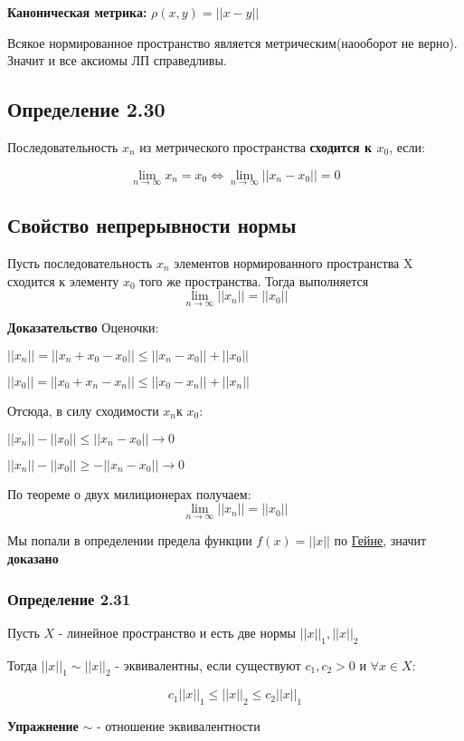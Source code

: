 \documentclass[12pt, english]{article}
\begin{document}
		\textbf{Каноническая метрика:} $\rho(x,y) = ||x-y||$
		
		Всякое нормированное пространство является метрическим(наооборот не верно). Значит и все аксиомы ЛП справедливы.
		
\subsection*{Определение 2.30}
	
	Последовательность ${x_n}$ из метрического пространства \textbf{сходится к $x_0$}, если:
	
	$$\lim_{n \to \infty} x_n = x_0 \Leftrightarrow \lim_{n \to \infty} ||x_n - x_0|| = 0$$
	
\subsection*{Свойство непрерывности нормы}\label{eq100}
	Пусть последовательность ${x_n}$ элементов нормированного пространства X сходится к элементу $x_0$ того же пространства. Тогда выполняется	
	$$\lim_{n \to \infty} ||x_n|| = ||x_0||$$
		
\textbf{Доказательство}		
	Оценочки:
	
	$||x_n|| = ||x_n + x_0 - x_0|| \leq ||x_n - x_0|| + ||x_0||$
	
	$||x_0|| = ||x_0 + x_n - x_n|| \leq ||x_0 - x_n|| + ||x_n||$
	
	Отсюда, в силу сходимости ${x_n}$к $x_0$:
	
	$||x_n|| - ||x_0|| \leq ||x_n - x_0|| \to 0 $
	
	$||x_n|| - ||x_0|| \ge -||x_n - x_0|| \to 0$
	
	По теореме о двух милиционерах получаем: 	$$\lim_{n \to \infty} ||x_n|| = ||x_0||$$
	
	Мы попали в определении предела функции $f(x) = ||x||$ по \hyperref[eq201]{Гейне}, значит \textbf{доказано}
	
\subsubsection*{Определение 2.31}
	Пусть $X$ - линейное пространство и есть две нормы $||x||_1, ||x||_2$
	
Тогда $||x||_1 \sim ||x||_2$ - эквивалентны, если существуют $c_1, c_2 > 0$ и $\forall x \in X$:

	$$c_1||x||_1 \leq ||x||_2 \leq c_2||x||_1$$
		
\textbf{Упражнение}		
	$\sim$ - отношение эквивалентности
\end{document}
